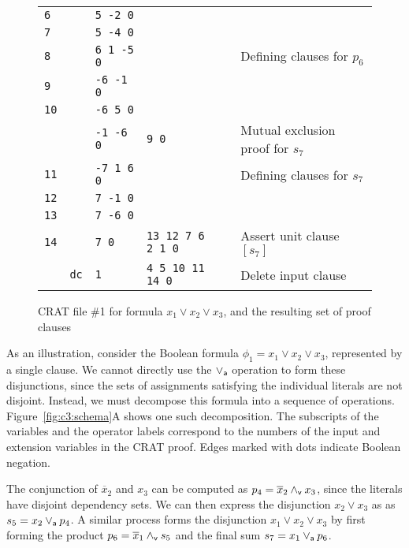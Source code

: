 \documentclass{llncs}
\newcommand{\pand}{\mathbin{\land_{\sf v}}}
\newcommand{\por}{\mathbin{\lor_{\sf a}}}
\newcommand{\obar}[1]{\overline{#1}}
\begin{document}
\begin{figure}
\begin{center}
\begin{tabular}{lcllll}
    {\tt 6} &     & {\tt  5 -2 0}    &  &  \\  %
    {\tt 7} &     & {\tt  5 -4 0}    &  & &  \\  %
    {\tt 8} &     & {\tt 6  1 -5 0}  &    & & Defining clauses for $p_6$ \\ 
    {\tt 9} &     & {\tt -6 -1 0}    &  & &  \\  %
    {\tt 10} &     & {\tt -6 5 0}    &  & &  \\  %
            &     & {\tt -1 -6 0}   & {\tt 9 0}  & &  Mutual exclusion proof for $s_7$ \\
    {\tt 11} &     & {\tt -7 1 6 0}  &  & & Defining clauses for $s_7$ \\ 
    {\tt 12} &     & {\tt  7 -1 0}     & &  \\  %
    {\tt 13} &     & {\tt  7 -6 0}     & &  \\  %
    {\tt 14} &     & {\tt 7 0} & {\tt 13 12 7 6 2 1 0} & & Assert unit clause $[s_7]$ \\
             & {\tt dc}  & {\tt 1}  & {\tt 4 5 10 11 14 0} & & Delete input clause \\
  \end{tabular}
  \end{center}
  \caption{CRAT file \#1 for formula $x_1 \lor x_2 \lor x_3$, and the resulting set of proof clauses}
  \label{fig:c3:crat}
\end{figure}
    
As an illustration, consider the Boolean formula
$\phi_1 = x_1 \lor x_2 \lor x_3$,
represented by a single clause.  We cannot directly use the
$\por$ operation to form these disjunctions, since the sets of assignments
satisfying the individual literals are not disjoint.  Instead, we must
decompose this formula into a sequence of operations.
Figure~\ref{fig:c3:schema}A shows one such decomposition.
The subscripts of the variables and the operator labels correspond to
the numbers of the input and extension variables in the CRAT proof.
Edges marked with dots indicate Boolean negation.

The conjunction of $\obar{x}_2$ and $x_3$ can be computed as $p_4 =
\obar{x}_2 \pand x_3$, since the literals have disjoint dependency
sets. We can then express the disjunction $x_2 \lor x_3$ as
as $s_5 = x_2 \por p_4$.  A similar process forms the
disjunction $x_1 \lor x_2 \lor x_3$ by first forming the product $p_6
= \obar{x}_1 \pand s_5$ and the final sum $s_7 = x_1 \por p_6$.
\end{document}
